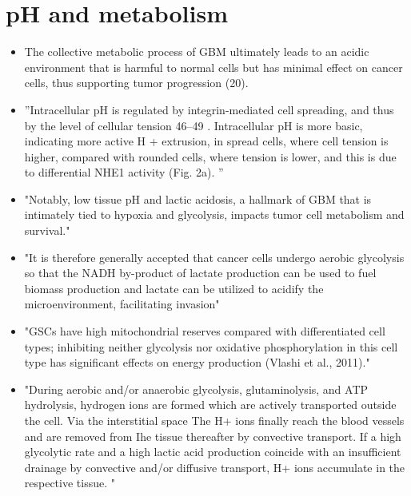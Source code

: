 \documentclass[11pt,a4paper]{article}
\begin{document}
\section{pH and metabolism}
\begin{itemize}
\item The collective metabolic process of GBM ultimately leads to an acidic environment that is harmful to normal cells but has minimal effect on cancer cells, thus supporting tumor progression (20).\cite{Chen2021}
\item ”Intracellular pH is regulated by integrin-mediated cell spreading, and thus by the level of cellular tension 46–49 . Intracellular pH is more basic, indicating more active H
+ extrusion, in spread cells, where cell tension is higher, compared with rounded cells, where tension is lower, and this is due to differential NHE1 activity (Fig. 2a). ”\cite{Romani2020}
\item "Notably, low tissue pH and lactic acidosis, a hallmark of GBM that is intimately tied to hypoxia and glycolysis, impacts tumor cell metabolism and survival."\cite{Chen2021}
\item "It is therefore generally accepted that cancer cells undergo aerobic glycolysis so that the NADH by-product of lactate production can be used to fuel biomass production and lactate can be utilized to acidify the microenvironment, facilitating invasion" \cite{Strickland2017}
\item "GSCs have high mitochondrial reserves compared with differentiated cell types; inhibiting neither glycolysis nor oxidative phosphorylation in this cell type has significant effects on energy production (Vlashi et al., 2011)."\cite{Strickland2017}
\item "During aerobic and/or anaerobic glycolysis, glutaminolysis, and ATP hydrolysis, hydrogen ions are formed which are actively transported outside the cell. Via the interstitial space The H+ ions finally reach the blood vessels and are removed from Ihe tissue thereafter by convective transport. If a high glycolytic rate and a high lactic acid production coincide with an insufficient drainage by convective and/or diffusive transport, H+ ions accumulate in the respective tissue. " \cite{Vaupel1990}
\end{itemize}
\end{document}

